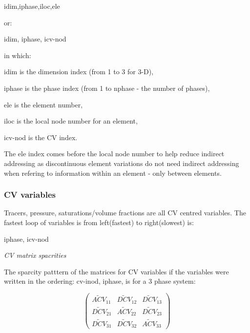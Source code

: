 \par\noindent
idim,iphase,iloc,ele

\par\noindent
or:


\par\noindent
idim, iphase, icv-nod

\par\noindent
in which:
\par\noindent
 idim is the dimension index (from 1 to 3 for 3-D), 
\par\noindent
iphase is the phase index (from 1 to nphase - the number of phases), 
\par\noindent
ele is the element number, 
\par\noindent
iloc is the local node number for an element, 
\par\noindent
icv-nod is the CV index.

The ele index comes before the local node number to help reduce indirect addressing 
as discontinuous element variations do not need indirect addressing when refering 
to information within an element - only between elements. 

\subsubsection{CV variables} 
Tracers, pressure, saturations/volume fractions are all CV centred variables. 
The fastest loop of variables is from left(fastest) to right(slowest) is: 

\par\noindent
iphase, icv-nod

\par\noindent
{\it CV matrix spacrities} 

The sparcity patttern of the matrices for CV variables if the variables were written 
in the ordering: cv-inod, iphase, is for a 3 phase system: 

\begin{equation}
  \begin{pmatrix}
\widetilde {ACV}_{11}  &  \widetilde {DCV}_{12}  &  \widetilde {DCV}_{13} \\
\widetilde {DCV}_{21}  &  \widetilde {ACV}_{22}  &  \widetilde {DCV}_{23} \\
\widetilde {DCV}_{31}  &  \widetilde {DCV}_{32}  &  \widetilde {ACV}_{33} 
  \end{pmatrix}
\label{CV-mat-spar}
\end{equation}

